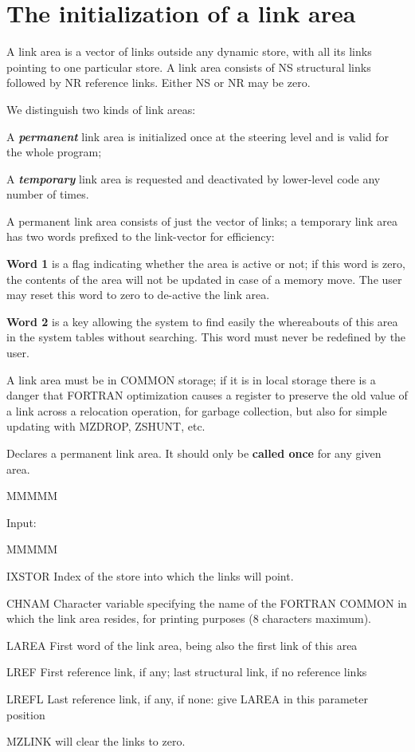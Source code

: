 \section{The initialization of a link area}
\par A link area is a vector of links outside any dynamic store, with
all its links pointing to one particular store. A link area
consists of NS structural links followed by NR reference links.
Either NS or NR may be zero.
\par We distinguish two kinds of link areas:
\begin{OL}
\item A {\bf\it permanent}
link area is initialized once at the steering level
and is valid for the whole program;
\item A {\bf\it temporary}
link area is requested and deactivated
by lower-level code any number of times.
\end{OL}
A permanent link area consists of just the vector of links;
a temporary link area has two words prefixed to the link-vector
for efficiency:
\begin{UL}
\item {\bf Word 1}
is a flag indicating whether the area is active or not;
if this word is zero, the contents of the area will
not be updated in case of a memory move.
The user may reset this word to zero to de-active the link area.
\item {\bf Word 2} is a key allowing the system to find easily the
whereabouts of this area in the system tables without searching.
This word must never be redefined by the user.
\end{UL}
A link area must be in COMMON storage;
if it is in local storage there is a danger that FORTRAN
optimization causes a register to preserve the old value of a link
across a relocation operation,
for garbage collection,
but also for simple updating with MZDROP, ZSHUNT, etc.
\par Declares a permanent link area. It should only be {\bf called
once} for any given area.
\begin{DL}{MMMMM}
\item[Input:
]
\begin{DL}{MMMMM}
\item[IXSTOR
]Index of the store into which the links will point.
\item[CHNAM
]Character variable specifying the
name of the FORTRAN COMMON in which the link area resides,
for printing purposes (8 characters maximum).
\item[LAREA
]First word of the link area,
being also the first link of this area
\item[LREF
]First reference link, if any;
last structural link, if no reference links
\item[LREFL
]Last reference link, if any,
if none: give LAREA in this parameter position
\end{DL}
\end{DL}
\par MZLINK will clear the links to zero.
